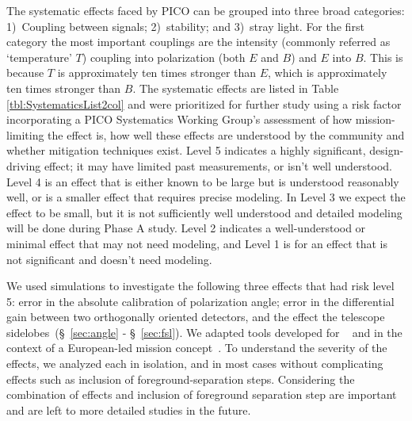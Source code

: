 \documentclass[PICOReport.tex]{subfiles}
\begin{document}
The systematic effects faced by PICO can be grouped into three broad categories: 1)~Coupling between signals; 2)~stability; and 3)~stray light. For the first category the most important couplings are the intensity (commonly referred as `temperature' $T$) coupling into polarization (both $E$ and $B$) and $E$ into $B$. This is because $T$ is approximately ten times stronger than $E$, which is approximately ten times stronger than $B$. The systematic effects are listed in Table \ref{tbl:SystematicsList2col} and were prioritized for further study using a risk factor incorporating a PICO Systematics Working Group's assessment of how mission-limiting the effect is, how well these effects are understood by the community and whether mitigation techniques exist.  Level 5 indicates a highly significant, design-driving effect; it may have limited past measurements, or isn't well understood.  Level 4 is an effect that is either known to be large but is understood reasonably well, or is a smaller effect that requires precise modeling.  In Level 3 we expect the effect to be small, but it is not sufficiently well understood and detailed modeling will be done during Phase A study. Level 2 indicates a well-understood or minimal effect that may not need modeling, and Level 1 is for an effect that is not significant and  doesn't need modeling. 

We used simulations to investigate the following three effects that had risk level 5: error in the absolute calibration of polarization angle; error in the differential gain between two orthogonally oriented detectors, and the effect the telescope sidelobes~(\S~\ref{sec:angle} - \S~\ref{sec:fsl}). We adapted tools developed for \planck~\cite{plank2015_xii_focalplane} and in the context of a European-led mission concept~\citep{core_systematics}. To understand the severity of the effects, we analyzed each in isolation, and in most cases without complicating effects such as inclusion of foreground-separation steps. Considering the combination of effects and inclusion of foreground separation step are important and are left to more detailed studies in the future. 


%

\end{document}
